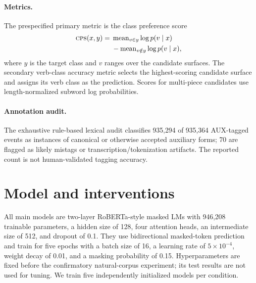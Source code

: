 \documentclass[11pt]{article}
\newcommand{\cps}{\textsc{cps}}
\begin{document}
\paragraph{Metrics.}
The prespecified primary metric is the class preference score
\begin{equation}
\begin{aligned}
  \cps(x,y)={}&\operatorname{mean}_{v\in y}\log p(v\mid x) \\
  &-\operatorname{mean}_{v\notin y}\log p(v\mid x),
\end{aligned}
\end{equation}
where $y$ is the target class and $v$ ranges over the candidate surfaces. The secondary verb-class accuracy metric selects the highest-scoring candidate surface and assigns its verb class as the prediction. Scores for multi-piece candidates use length-normalized subword log probabilities.

\paragraph{Annotation audit.}
The exhaustive rule-based lexical audit classifies 935,294 of 935,364 AUX-tagged events as instances of canonical or otherwise accepted auxiliary forms; 70 are flagged as likely mistags or transcription/tokenization artifacts. The reported count is not human-validated tagging accuracy.

\section{Model and interventions}

All main models are two-layer RoBERTa-style masked LMs with 946,208 trainable parameters, a hidden size of 128, four attention heads, an intermediate size of 512, and dropout of 0.1. They use bidirectional masked-token prediction \citep{devlin2019} and train for five epochs with a batch size of 16, a learning rate of $5\times10^{-4}$, weight decay of 0.01, and a masking probability of 0.15. Hyperparameters are fixed before the confirmatory natural-corpus experiment; its test results are not used for tuning. We train five independently initialized models per condition.
\end{document}
